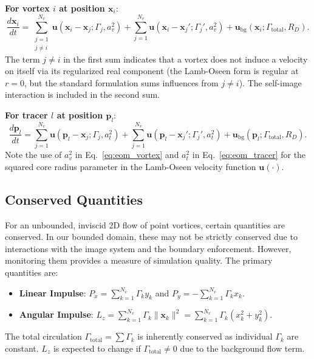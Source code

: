 \documentclass[12pt,letterpaper]{article}
\newcommand{\vel}{\bm{u}}
\newcommand{\pos}{\bm{x}}
\newcommand{\tracerpos}{\bm{p}}
\newcommand{\vortstrength}{\Gamma}
\newcommand{\domainradius}{R_D}
\newcommand{\corevsq}{a_v^2}
\newcommand{\coretsq}{a_t^2}
\begin{document}
\textbf{For vortex $i$ at position $\pos_i$}:
\begin{equation}
    \frac{d\pos_i}{dt} = \sum_{\substack{j=1 \\ j \neq i}}^{N_v} \vel(\pos_i - \pos_j; \vortstrength_j, \corevsq) 
                      + \sum_{j=1}^{N_v} \vel(\pos_i - \pos_j'; \vortstrength_j', \corevsq) 
                      + \vel_{\text{bg}}(\pos_i; \vortstrength_{\text{total}}, \domainradius).
    \label{eq:eom_vortex}
\end{equation}
The term $j \neq i$ in the first sum indicates that a vortex does not induce a velocity on itself via its regularized real component (the Lamb-Oseen form is regular at $r=0$, but the standard formulation sums influences from $j \ne i$). The self-image interaction is included in the second sum.

\textbf{For tracer $l$ at position $\tracerpos_l$}:
\begin{equation}
    \frac{d\tracerpos_l}{dt} = \sum_{j=1}^{N_v} \vel(\tracerpos_l - \pos_j; \vortstrength_j, \coretsq) 
                          + \sum_{j=1}^{N_v} \vel(\tracerpos_l - \pos_j'; \vortstrength_j', \coretsq) 
                          + \vel_{\text{bg}}(\tracerpos_l; \vortstrength_{\text{total}}, \domainradius).
    \label{eq:eom_tracer}
\end{equation}
Note the use of $\corevsq$ in Eq.~\eqref{eq:eom_vortex} and $\coretsq$ in Eq.~\eqref{eq:eom_tracer} for the squared core radius parameter in the Lamb-Oseen velocity function $\vel(\cdot)$.

\subsection{Conserved Quantities}
For an unbounded, inviscid 2D flow of point vortices, certain quantities are conserved. In our bounded domain, these may not be strictly conserved due to interactions with the image system and the boundary enforcement. However, monitoring them provides a measure of simulation quality. The primary quantities are:
\begin{itemize}
    \item \textbf{Linear Impulse}: $P_x = \sum_{k=1}^{N_v} \vortstrength_k y_k$ and $P_y = -\sum_{k=1}^{N_v} \vortstrength_k x_k$.
    \item \textbf{Angular Impulse}: $L_z = \sum_{k=1}^{N_v} \vortstrength_k \|\pos_k\|^2 = \sum_{k=1}^{N_v} \vortstrength_k (x_k^2 + y_k^2)$.
\end{itemize}
The total circulation $\vortstrength_{\text{total}} = \sum \vortstrength_k$ is inherently conserved as individual $\vortstrength_k$ are constant. $L_z$ is expected to change if $\vortstrength_{\text{total}} \ne 0$ due to the background flow term.
\end{document}
